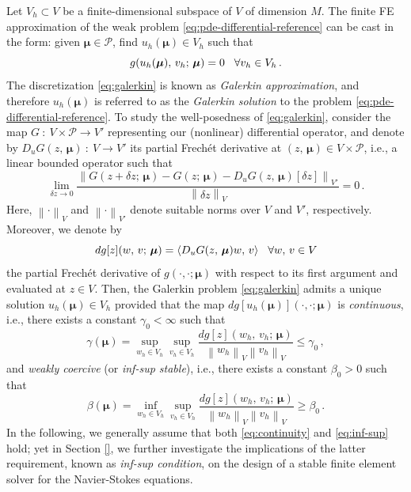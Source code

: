 \documentclass[12pt, a4paper, twoside, openright]{report}
\numberwithin{equation}{chapter}
\theoremstyle{theorem}
\theoremstyle{definition}
\theoremstyle{remark}
\theoremstyle{proposition}
\numberwithin{figure}{chapter}
\newcommand{\norm}[1]{\left\lVert#1\right\rVert}
\newcommand{\bg}[1]{\boldsymbol{#1}}
\begin{document}
		Let $V_h \subset V$ be a finite-dimensional subspace of $V$ of dimension $M$. The finite FE approximation of the weak problem \eqref{eq:pde-differential-reference} can be cast in the form: given $\bg{\mu} \in \mathcal{P}$, find $u_h(\bg{\mu}) \in V_h$ such that 
		\begin{equation}
			\label{eq:galerkin}
			g(u_h(\bg{\mu}), \, v_h; \, \bg{\mu}) = 0 \hspace*{0.3cm} \forall v_h \in V_h \, .
		\end{equation}
		The discretization \eqref{eq:galerkin} is known as \emph{Galerkin approximation}, and therefore $u_h(\bg{\mu})$ is referred to as the \emph{Galerkin solution} to the problem \eqref{eq:pde-differential-reference}. To study the well-posedness of \eqref{eq:galerkin}, consider the map $G ~ : ~ V \times \mathcal{P} \rightarrow V'$ representing our (nonlinear) differential operator, and denote by $D_u G(z, \, \bg{\mu}) ~ : ~ V \rightarrow V'$ its partial Frech\'et derivative at $(z, \, \bg{\mu}) \in V \times \mathcal{P}$, i.e., a linear bounded operator such that \cite{Rud64}
		\begin{equation*}
			\lim_{\delta z \to 0} \dfrac{\norm{G(z + \delta z; \, \bg{\mu}) - G(z; \, \bg{\mu}) - D_u G(z, \, \bg{\mu})[\delta z]}_{V'}}{\norm{\delta z}_V}  = 0 \, .
		\end{equation*}
		Here, $\norm{\cdot}_V$ and $\norm{\cdot}_{V'}$ denote suitable norms over $V$ and $V'$, respectively. Moreover, we denote by
		\begin{equation*}
			dg[z](w, \, v; \, \bg{\mu}) = \langle D_u G(z, \, \bg{\mu}) w, \, v \rangle \hspace*{0.3cm} \forall w, \, v \in V
		\end{equation*}
		the partial Frech\'et derivative of $g(\cdot, \cdot; \bg{\mu})$ with respect to its first argument and evaluated at $z \in V$. Then, the Galerkin problem \eqref{eq:galerkin} admits a unique solution $u_h(\bg{\mu}) \in V_h$ provided that the map $dg[u_h(\bg{\mu})](\cdot,\cdot; \bg{\mu})$ is \emph{continuous}, i.e., there exists a constant $\gamma_0 < \infty$ such that
		\begin{equation}
			\label{eq:continuity}
			\gamma(\bg{\mu}) = \sup_{w_h \in V_h} \sup_{v_h \in V_h} \dfrac{dg[z](w_h, \, v_h; \, \bg{\mu})}{\norm{w_h}_V \norm{v_h}_V} \leq \gamma_0 \, ,
		\end{equation}
		and \emph{weakly coercive} (or \emph{inf-sup stable}), i.e., there exists a constant $\beta_0 > 0$ such that
		\begin{equation}
			\label{eq:inf-sup}
			\beta(\bg{\mu}) = \inf_{w_h \in V_h} \sup_{v_h \in V_h} \dfrac{dg[z](w_h, \, v_h; \, \bg{\mu})}{\norm{w_h}_V \norm{v_h}_V} \geq \beta_0 \, .
		\end{equation}
		In the following, we generally assume that both \eqref{eq:continuity} and \eqref{eq:inf-sup} hold; yet in Section \ref{}, we further investigate the implications of the latter requirement, known as \emph{inf-sup condition}, on the design of a stable finite element solver for the Navier-Stokes equations.
		
\end{document}
